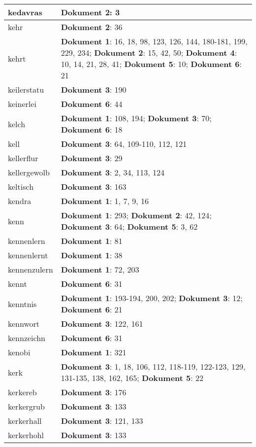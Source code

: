 \documentclass[a5paper]{article}
\begin{document}
\begin{longtable}[l]{|l|p{3in}|}
\hline
kedavras & \textbf{Dokument 2}: 3 \\
\hline
kehr & \textbf{Dokument 2}: 36 \\
\hline
kehrt & \textbf{Dokument 1}: 16, 18, 98, 123, 126, 144, 180-181, 199, 229, 234; \textbf{Dokument 2}: 15, 42, 50; \textbf{Dokument 4}: 10, 14, 21, 28, 41; \textbf{Dokument 5}: 10; \textbf{Dokument 6}: 21 \\
\hline
keilerstatu & \textbf{Dokument 3}: 190 \\
\hline
keinerlei & \textbf{Dokument 6}: 44 \\
\hline
kelch & \textbf{Dokument 1}: 108, 194; \textbf{Dokument 3}: 70; \textbf{Dokument 6}: 18 \\
\hline
kell & \textbf{Dokument 3}: 64, 109-110, 112, 121 \\
\hline
kellerflur & \textbf{Dokument 3}: 29 \\
\hline
kellergewolb & \textbf{Dokument 3}: 2, 34, 113, 124 \\
\hline
keltisch & \textbf{Dokument 3}: 163 \\
\hline
kendra & \textbf{Dokument 1}: 1, 7, 9, 16 \\
\hline
kenn & \textbf{Dokument 1}: 293; \textbf{Dokument 2}: 42, 124; \textbf{Dokument 3}: 64; \textbf{Dokument 5}: 3, 62 \\
\hline
kennenlern & \textbf{Dokument 1}: 81 \\
\hline
kennenlernt & \textbf{Dokument 1}: 38 \\
\hline
kennenzulern & \textbf{Dokument 1}: 72, 203 \\
\hline
kennt & \textbf{Dokument 6}: 31 \\
\hline
kenntnis & \textbf{Dokument 1}: 193-194, 200, 202; \textbf{Dokument 3}: 12; \textbf{Dokument 6}: 21 \\
\hline
kennwort & \textbf{Dokument 3}: 122, 161 \\
\hline
kennzeichn & \textbf{Dokument 6}: 31 \\
\hline
kenobi & \textbf{Dokument 1}: 321 \\
\hline
kerk & \textbf{Dokument 3}: 1, 18, 106, 112, 118-119, 122-123, 129, 131-135, 138, 162, 165; \textbf{Dokument 5}: 22 \\
\hline
kerkereb & \textbf{Dokument 3}: 176 \\
\hline
kerkergrub & \textbf{Dokument 3}: 133 \\
\hline
kerkerhall & \textbf{Dokument 3}: 121, 133 \\
\hline
kerkerhohl & \textbf{Dokument 3}: 133 \\

\end{longtable}
\end{document}
